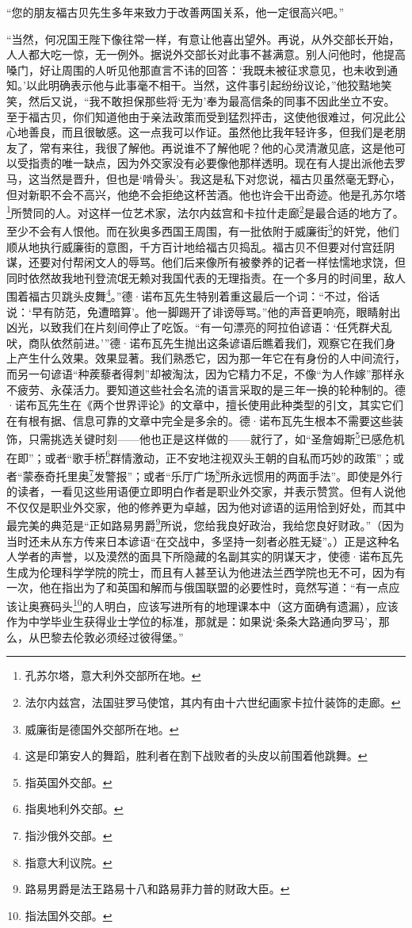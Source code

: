 \par “您的朋友福古贝先生多年来致力于改善两国关系，他一定很高兴吧。”
\par “当然，何况国王陛下像往常一样，有意让他喜出望外。再说，从外交部长开始，人人都大吃一惊，无一例外。据说外交部长对此事不甚满意。别人问他时，他提高嗓门，好让周围的人听见他那直言不讳的回答：‘我既未被征求意见，也未收到通知。’以此明确表示他与此事毫不相干。当然，这件事引起纷纷议论，”他狡黠地笑笑，然后又说，“我不敢担保那些将‘无为’奉为最高信条的同事不因此坐立不安。至于福古贝，你们知道他由于亲法政策而受到猛烈抨击，这使他很难过，何况此公心地善良，而且很敏感。这一点我可以作证。虽然他比我年轻许多，但我们是老朋友了，常有来往，我很了解他。再说谁不了解他呢？他的心灵清澈见底，这是他可以受指责的唯一缺点，因为外交家没有必要像他那样透明。现在有人提出派他去罗马，这当然是晋升，但也是‘啃骨头’。我这是私下对您说，福古贝虽然毫无野心，但对新职不会不高兴，他绝不会拒绝这杯苦酒。他也许会干出奇迹。他是孔苏尔塔\footnote{孔苏尔塔，意大利外交部所在地。}所赞同的人。对这样一位艺术家，法尔内兹宫和卡拉什走廊\footnote{法尔内兹宫，法国驻罗马使馆，其内有由十六世纪画家卡拉什装饰的走廊。}是最合适的地方了。至少不会有人恨他。而在狄奥多西国王周围，有一批依附于威廉街\footnote{威廉街是德国外交部所在地。}的奸党，他们顺从地执行威廉街的意图，千方百计地给福古贝捣乱。福古贝不但要对付宫廷阴谋，还要对付帮闲文人的辱骂。他们后来像所有被豢养的记者一样怯懦地求饶，但同时依然故我地刊登流氓无赖对我国代表的无理指责。在一个多月的时间里，敌人围着福古贝跳头皮舞\footnote{这是印第安人的舞蹈，胜利者在割下战败者的头皮以前围着他跳舞。}。”德·诺布瓦先生特别着重这最后一个词：“不过，俗话说：‘早有防范，免遭暗算’。他一脚踢开了诽谤辱骂。”他的声音更响亮，眼睛射出凶光，以致我们在片刻间停止了吃饭。“有一句漂亮的阿拉伯谚语：‘任凭群犬乱吠，商队依然前进。’”德·诺布瓦先生抛出这条谚语后瞧着我们，观察它在我们身上产生什么效果。效果显著。我们熟悉它，因为那一年它在有身份的人中间流行，而另一句谚语“种蒺藜者得刺”却被淘汰，因为它精力不足，不像“为人作嫁”那样永不疲劳、永葆活力。要知道这些社会名流的语言采取的是三年一换的轮种制的。德·诺布瓦先生在《两个世界评论》的文章中，擅长使用此种类型的引文，其实它们在有根有据、信息可靠的文章中完全是多余的。德·诺布瓦先生根本不需要这些装饰，只需挑选关键时刻——他也正是这样做的——就行了，如“圣詹姆斯\footnote{指英国外交部。}已感危机在即”；或者“歌手桥\footnote{指奥地利外交部。}群情激动，正不安地注视双头王朝的自私而巧妙的政策”；或者“蒙泰奇托里奥\footnote{指沙俄外交部。}发警报”；或者“乐厅广场\footnote{指意大利议院。}所永远惯用的两面手法”。即使是外行的读者，一看见这些用语便立即明白作者是职业外交家，并表示赞赏。但有人说他不仅仅是职业外交家，他的修养更为卓越，因为他对谚语的运用恰到好处，而其中最完美的典范是“正如路易男爵\footnote{路易男爵是法王路易十八和路易菲力普的财政大臣。}所说，您给我良好政治，我给您良好财政。”（因为当时还未从东方传来日本谚语“在交战中，多坚持一刻者必胜无疑”。）正是这种名人学者的声誉，以及漠然的面具下所隐藏的名副其实的阴谋天才，使德·诺布瓦先生成为伦理科学学院的院士，而且有人甚至认为他进法兰西学院也无不可，因为有一次，他在指出为了和英国和解而与俄国联盟的必要性时，竟然写道：“有一点应该让奥赛码头\footnote{指法国外交部。}的人明白，应该写进所有的地理课本中（这方面确有遗漏），应该作为中学毕业生获得业士学位的标准，那就是：如果说‘条条大路通向罗马’，那么，从巴黎去伦敦必须经过彼得堡。”
